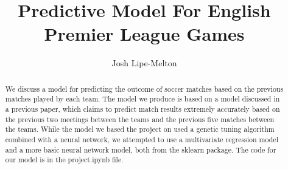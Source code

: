 \documentclass[sigconf]{acmart}
\begin{document}
\title{Predictive Model For English Premier League Games}
\author{Josh Lipe-Melton}

\renewcommand{\shortauthors}{J. Lipe-Melton}

\begin{abstract}
We discuss a model for predicting the outcome of soccer matches based on the previous matches played by each team. The model we produce is based on a model discussed in a previous paper, which claims to predict match results extremely accurately based on the previous two meetings between the teams and the previous five matches between the teams. While the model we based the project on used a genetic tuning algorithm combined with a neural network, we attempted to use a multivariate regression model and a more basic neural network model, both from the sklearn package. The code for our model is in the project.ipynb file.
\end{abstract}


\maketitle
\end{document}
